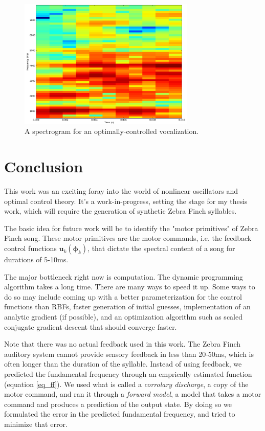 \documentclass{article} %
\begin{document}
\begin{figure}[h]
\centering
\includegraphics[width=0.75\textwidth]{images/spectrogram.png}
\caption{A spectrogram for an optimally-controlled vocalization.}
\label{fig:spectrogram}
\end{figure}


\section{Conclusion}

This work was an exciting foray into the world of nonlinear oscillators and optimal control
theory. It's a work-in-progress, setting the stage for my thesis work, which will require
the generation of synthetic Zebra Finch syllables.

The basic idea for future work will be to identify the "motor primitives" of Zebra Finch
song. These motor primitives are the motor commands, i.e. the feedback control functions
$\bm{u}_k(\bm{\phi}_k)$, that dictate the spectral content of a song for durations of 5-10ms.

The major bottleneck right now is computation. The dynamic programming algorithm takes a
long time. There are many ways to speed it up. Some ways to do so may include coming up
with a better parameterization for the control functions than RBFs, faster generation of
initial guesses, implementation of an analytic gradient (if possible), and an optimization
algorithm such as scaled conjugate gradient descent that should converge faster.

Note that there was no actual feedback used in this work. The Zebra Finch auditory system
cannot provide sensory feedback in less than 20-50ms, which is often longer than the
duration of the syllable. Instead of using feedback, we predicted the fundamental frequency
through an emprically estimated function (equation \eqref{eq_ff}). We used what is called
a \emph{corrolary discharge}, a copy of the motor command, and ran it through a
\emph{forward model}, a model that takes a motor command and produces a prediction of
the output state. By doing so we formulated the error in the predicted fundamental
frequency, and tried to minimize that error.
\end{document}
